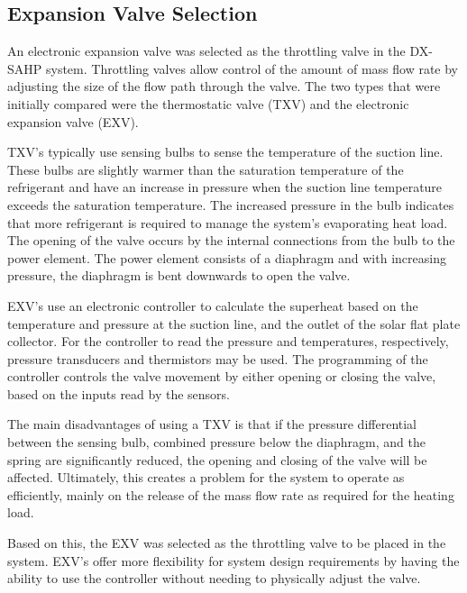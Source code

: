 \subsection{Expansion Valve Selection}

An electronic expansion valve was selected as the throttling valve in the DX-SAHP system. Throttling valves allow control of the amount of mass flow rate by adjusting the size of the flow path through the valve. The two types that were initially compared were the thermostatic valve (TXV) and the electronic expansion valve (EXV). 

\medskip
TXV’s typically use sensing bulbs to sense the temperature of the suction line. These bulbs are slightly warmer than the saturation temperature of the refrigerant and have an increase in pressure when the suction line temperature exceeds the saturation temperature. The increased pressure in the bulb indicates that more refrigerant is required to manage the system’s evaporating heat load. The opening of the valve occurs by the internal connections from the bulb to the power element. The power element consists of a diaphragm and with increasing pressure, the diaphragm is bent downwards to open the valve.

\medskip
EXV’s use an electronic controller to calculate the superheat based on the temperature and pressure at the suction line, and the outlet of the solar flat plate collector. For the controller to read the pressure and temperatures, respectively, pressure transducers and thermistors may be used. The programming of the controller controls the valve movement by either opening or closing the valve, based on the inputs read by the sensors.

\medskip
The main disadvantages of using a TXV is that if the pressure differential between the sensing bulb, combined pressure below the diaphragm, and the spring are significantly reduced, the opening and closing of the valve will be affected. Ultimately, this creates a problem for the system to operate as efficiently, mainly on the release of the mass flow rate as required for the heating load.

\medskip
Based on this, the EXV was selected as the throttling valve to be placed in the system. EXV’s offer more flexibility for system design requirements by having the ability to use the controller without needing to physically adjust the valve.